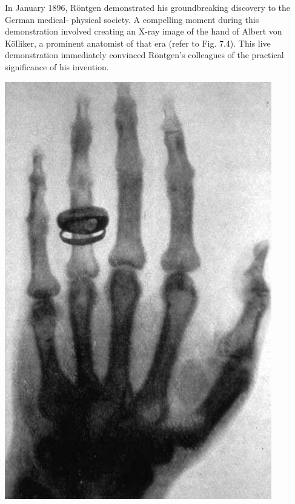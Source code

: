 \documentclass[a4paper,12pt]{report}
\begin{document}
In January 1896, Röntgen demonstrated his groundbreaking discovery to the German medical-
physical society. A compelling moment during this demonstration involved creating an X-ray
image of the hand of Albert von Kölliker, a prominent anatomist of that era (refer to Fig. 7.4).
This live demonstration immediately convinced Röntgen's colleagues of the practical significance
of his invention.
\newpage
\begin{center}
  \includegraphics[scale= 0.3]{KollikerHand.jpg}
  \label{KollikerHand}
\end{center}
\end{document}
